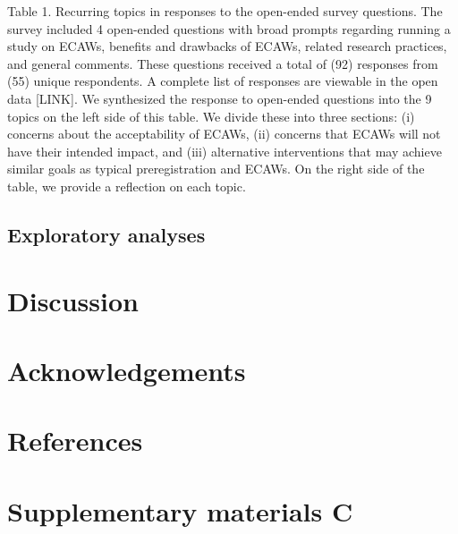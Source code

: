 \documentclass[
  man,floatsintext]{apa6}
\newlength{\cslhangindent}
\newlength{\cslentryspacingunit} %
\newenvironment{CSLReferences}[2] %
 {%
  \setlength{\parindent}{0pt}
  \ifodd #1
  \let\oldpar\par
  \def\par{\hangindent=\cslhangindent\oldpar}
  \fi
  \setlength{\parskip}{#2\cslentryspacingunit}
 }%
 {}
\begin{document}
Table 1. Recurring topics in responses to the open-ended survey questions. The survey included 4 open-ended questions with broad prompts regarding running a study on ECAWs, benefits and drawbacks of ECAWs, related research practices, and general comments. These questions received a total of (92) responses from (55) unique respondents. A complete list of responses are viewable in the open data {[}LINK{]}. We synthesized the response to open-ended questions into the 9 topics on the left side of this table. We divide these into three sections: (i) concerns about the acceptability of ECAWs, (ii) concerns that ECAWs will not have their intended impact, and (iii) alternative interventions that may achieve similar goals as typical preregistration and ECAWs. On the right side of the table, we provide a reflection on each topic.

\hypertarget{exploratory-analyses}{%
\subsection{Exploratory analyses}\label{exploratory-analyses}}

\hypertarget{discussion}{%
\section{Discussion}\label{discussion}}

\hypertarget{acknowledgements}{%
\section{Acknowledgements}\label{acknowledgements}}

\newpage

\hypertarget{references}{%
\section{References}\label{references}}

\hypertarget{refs}{}
\begin{CSLReferences}{0}{0}
\end{CSLReferences}

\newpage

\hypertarget{appendix-appendix}{%
\appendix}


\hypertarget{supplementary-materials-c}{%
\section{Supplementary materials C}\label{supplementary-materials-c}}
\end{document}
